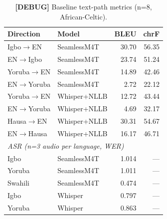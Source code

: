 
\begin{table}[t]
\centering
\small
\caption{\textbf{[DEBUG]} Baseline text-path metrics (n=8, African-Celtic).}
\label{tab:p4_debug}
\begin{tabular}{llrr}
\toprule
\textbf{Direction} & \textbf{Model} & \textbf{BLEU} & \textbf{chrF} \\
\midrule
Igbo$\to$EN   & SeamlessM4T  & 30.70 & 56.35 \\
EN$\to$Igbo   & SeamlessM4T  & 23.74 & 51.24 \\
Yoruba$\to$EN & SeamlessM4T  & 14.89 & 42.46 \\
EN$\to$Yoruba & SeamlessM4T  &  2.72 & 22.12 \\
Yoruba$\to$EN & Whisper+NLLB & 12.72 & 43.44 \\
EN$\to$Yoruba & Whisper+NLLB &  4.69 & 32.17 \\
Hausa$\to$EN  & Whisper+NLLB & 30.31 & 54.67 \\
EN$\to$Hausa  & Whisper+NLLB & 16.17 & 46.71 \\
\midrule
\multicolumn{4}{l}{\textit{ASR (n=3 audio per language, WER)}} \\
Igbo    & SeamlessM4T & 1.014 & — \\
Yoruba  & SeamlessM4T & 1.011 & — \\
Swahili & SeamlessM4T & 0.474 & — \\
Igbo    & Whisper     & 0.797 & — \\
Yoruba  & Whisper     & 0.863 & — \\
\bottomrule
\end{tabular}
\end{table}
